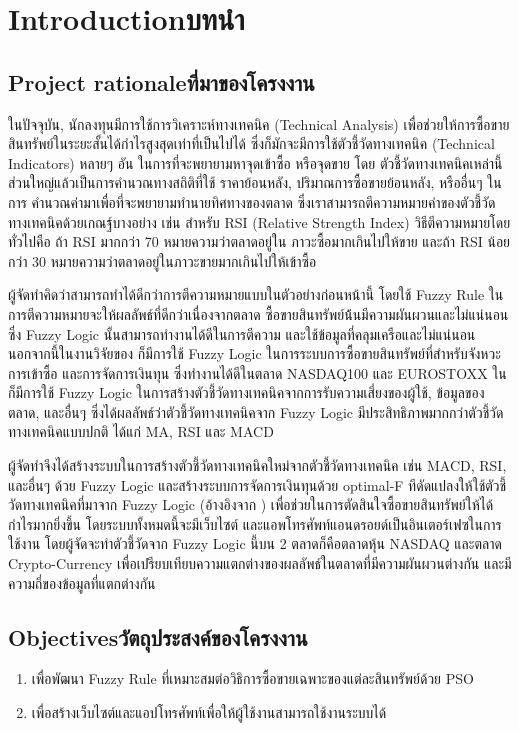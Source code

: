 \chapter{\ifenglish Introduction\else บทนำ\fi}

\section{\ifenglish Project rationale\else ที่มาของโครงงาน\fi}
ในปัจจุบัน, นักลงทุนมีการใช้การวิเคราะห์ทางเทคนิค (Technical Analysis) เพื่อช่วยให้การซื้อขายสินทรัพย์ในระยะสั้นได้กำไรสูงสุดเท่าที่เป็นไปได้
ซึ่งก็มักจะมีการใช้ตัวชี้วัดทางเทคนิค (Technical Indicators) หลายๆ อัน ในการที่จะพยายามหาจุดเข้าซื้อ หรือจุดขาย โดย 
ตัวชี้วัดทางเทคนิคเหล่านี้ส่วนใหญ่แล้วเป็นการคำนวณทางสถิติที่ใช้ ราคาย้อนหลัง, ปริมาณการซื้อขายย้อนหลัง, หรืออื่นๆ ในการ
คำนวณค่ามาเพื่อที่จะพยายามทำนายทิศทางของตลาด ซึ่งเราสามารถตีความหมายค่าของตัวชี้วัดทางเทคนิคด้วยเกณฐ์บางอย่าง เช่น 
สำหรับ RSI (Relative Strength Index) วิธีตีความหมายโดยทั่วไปคือ ถ้า RSI มากกว่า 70 หมายความว่าตลาดอยู่ใน
ภาวะซื้อมากเกินไปให้ขาย และถ้า RSI น้อยกว่า 30 หมายความว่าตลาดอยู่ในภาวะขายมากเกินไปให้เข้าซื้อ

ผู้จัดทำคิดว่าสามารถทำได้ดีกว่าการตีความหมายแบบในตัวอย่างก่อนหน้านี้ โดยใช้ Fuzzy Rule ในการตีความหมายจะให้ผลลัพธ์ที่ดีกว่าเนื่องจากตลาด
ซื้อขายสินทรัพย์น้้นมีความผันผวนและไม่แน่นอน ซึ่ง Fuzzy Logic นั้นสามารถทำงานได้ดีในการตีความ และใช้ข้อมูลที่คลุมเครือและไม่แน่นอน
นอกจากนี้ในงานวิจัยของ \cite{Rodrigo} ก็มีการใช้ Fuzzy Logic ในการระบบการซื้อขายสินทรัพย์ที่สำหรับจังหวะการเข้าซื้อ
และการจัดการเงินทุน ซึ่งทำงานได้ดีในตลาด NASDAQ100 และ EUROSTOXX ใน \cite{Escobar} ก็มีการใช้ Fuzzy Logic
ในการสร้างตัวชี้วัดทางเทคนิคจากการรับความเสี่ยงของผู้ใช้, ข้อมูลของตลาด, และอื่นๆ ซึ่งได้ผลลัพธ์ว่าตัวชี้วัดทางเทคนิคจาก Fuzzy Logic
มีประสิทธิภาพมากกว่าตัวชี้วัดทางเทคนิคแบบปกติ ได้แก่ MA, RSI และ MACD

ผู้จัดทำจึงได้สร้างระบบในการสร้างตัวชี้วัดทางเทคนิคใหม่จากตัวชี้วัดทางเทคนิค เช่น MACD, RSI, และอื่นๆ ด้วย Fuzzy Logic และสร้างระบบการจัดการเงินทุนด้วย
optimal-F ทีดัดแปลงให้ใช้ตัวชี้วัดทางเทคนิคที่มาจาก Fuzzy Logic (อ้างอิงจาก \cite{Rodrigo}) เพื่อช่วยในการตัดสินใจซื้อขายสินทรัพย์ให้ได้กำไรมากยิ่งขึ้น
โดยระบบทั้งหมดนี้จะมีเว็บไซต์ และแอพโทรศัพท์แอนดรอยด์เป็นอินเตอร์เฟซในการใช้งาน โดยผู้จัดจะทำตัวชี้วัดจาก Fuzzy Logic นี้บน 2 ตลาดก็คือตลาดหุ้น NASDAQ และตลาด Crypto-Currency
เพื่อเปรียบเทียบความแตกต่างของผลลัพธ์ในตลาดที่มีความผันผวนต่างกัน และมีความถึ่ของข้อมูลที่แตกต่างกัน

\section{\ifenglish Objectives\else วัตถุประสงค์ของโครงงาน\fi}
\begin{enumerate}
    \item เพื่อพัฒนา Fuzzy Rule ที่เหมาะสมต่อวิธิการซื้อขายเฉพาะของแต่ละสินทรัพย์ด้วย PSO
    \item เพื่อสร้างเว็บไซต์และแอปโทรศัพท์เพื่อให้ผู้ใช้งานสามารถใช้งานระบบได้
\end{enumerate}


